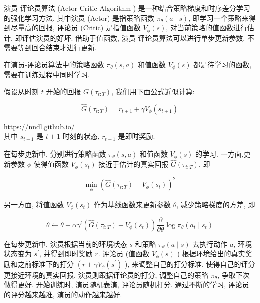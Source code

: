 \documentclass[10pt]{article}
\begin{document}
演员-评论员算法 (Actor-Critic Algorithm ) 是一种结合策略梯度和时序差分学习的强化学习方法. 其中演员 (Actor) 是指策略函数 $\pi_{\theta}(a \mid s)$, 即学习一个策略来得到尽量高的回报, 评论员 (Critic) 是指值函数 $V_{\phi}(s)$, 对当前策略的值函数进行估计, 即评估演员的好坏. 借助于值函数, 演员-评论员算法可以进行单步更新参数, 不需要等到回合结束才进行更新.

在演员-评论员算法中的策略函数 $\pi_{\theta}(s, a)$ 和值函数 $V_{\phi}(s)$ 都是待学习的函数,需要在训练过程中同时学习.

假设从时刻 $t$ 开始的回报 $G\left(\tau_{t: T}\right)$, 我们用下面公式近似计算:


\begin{equation*}
\hat{G}\left(\tau_{t: T}\right)=r_{t+1}+\gamma V_{\phi}\left(s_{t+1}\right) \tag{14.71}
\end{equation*}


\href{https://nndl.github.io/}{https://nndl.github.io/}\\
其中 $s_{t+1}$ 是 $t+1$ 时刻的状态, $r_{t+1}$ 是即时奖励.

在每步更新中, 分别进行策略函数 $\pi_{\theta}(s, a)$ 和值函数 $V_{\phi}(s)$ 的学习. 一方面,更新参数 $\phi$ 使得值函数 $V_{\phi}\left(s_{t}\right)$ 接近于估计的真实回报 $\hat{G}\left(\tau_{t: T}\right)$, 即


\begin{equation*}
\min _{\phi}\left(\hat{G}\left(\tau_{t: T}\right)-V_{\phi}\left(s_{t}\right)\right)^{2} \tag{14.72}
\end{equation*}


另一方面, 将值函数 $V_{\phi}\left(s_{t}\right)$ 作为基线函数来更新参数 $\theta$, 减少策略梯度的方差, 即


\begin{equation*}
\theta \leftarrow \theta+\alpha \gamma^{t}\left(\hat{G}\left(\tau_{t: T}\right)-V_{\phi}\left(s_{t}\right)\right) \frac{\partial}{\partial \theta} \log \pi_{\theta}\left(a_{t} \mid s_{t}\right) \tag{14.73}
\end{equation*}


在每步更新中, 演员根据当前的环境状态 $s$ 和策略 $\pi_{\theta}(a \mid s)$ 去执行动作 $a$, 环境状态变为 $s^{\prime}$, 并得到即时奖励 $r$. 评论员 (值函数 $V_{\phi}(s)$ ) 根据环境给出的真实奖励和之前标准下的打分 $\left(r+\gamma V_{\phi}\left(s^{\prime}\right)\right.$ ), 来调整自己的打分标准, 使得自己的评分更接近环境的真实回报. 演员则跟据评论员的打分, 调整自己的策略 $\pi_{\theta}$, 争取下次做得更好. 开始训练时, 演员随机表演, 评论员随机打分. 通过不断的学习, 评论员的评分越来越准, 演员的动作越来越好.
\end{document}
